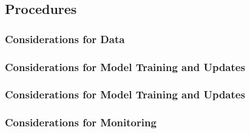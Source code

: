 \documentclass[fleqn]{article}
\begin{document}
\subsection{Procedures}\label{sec:genpro}


\subsubsection{Considerations for Data}\label{sec:data}


\subsubsection{Considerations for Model Training and Updates}\label{sec:train}


\subsubsection{Considerations for Model Training and Updates}\label{sec:valid}


\subsubsection{Considerations for Monitoring}\label{sec:monitor}

\end{document}

